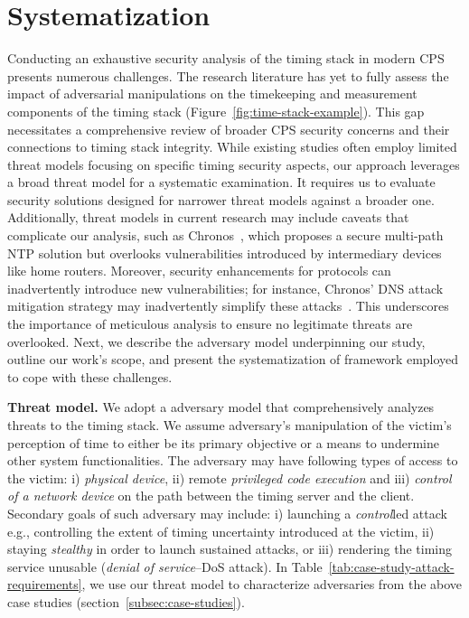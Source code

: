 \section{Systematization}\label{overview}

Conducting an exhaustive security analysis of the timing stack in modern CPS presents numerous challenges. The research literature has yet to fully assess the impact of adversarial manipulations on the timekeeping and measurement components of the timing stack (Figure~\ref{fig:time-stack-example}). This gap necessitates a comprehensive review of broader CPS security concerns and their connections to timing stack integrity. While existing studies often employ limited threat models focusing on specific timing security aspects, our approach leverages a broad threat model for a systematic examination. It requires us to evaluate security solutions designed for narrower threat models against a broader one. Additionally, threat models in current research may include caveats that complicate our analysis, such as Chronos~\cite{net-sync-chronos}, which proposes a secure multi-path NTP solution but overlooks vulnerabilities introduced by intermediary devices like home routers. Moreover, security enhancements for protocols can inadvertently introduce new vulnerabilities; for instance, Chronos' DNS attack mitigation strategy may inadvertently simplify these attacks~\cite{pitfalls-chronos}. This underscores the importance of meticulous analysis to ensure no legitimate threats are overlooked. Next, we describe the adversary model underpinning our study, outline our work's scope, and present the systematization of framework employed to cope with these challenges.

\noindent\textbf{Threat model.} We adopt a adversary model that comprehensively analyzes threats to the timing stack. We assume adversary's manipulation of the victim's perception of time to either be its primary objective or a means to undermine other system functionalities. The adversary may have following types of access to the victim: i) \textit{physical device}, ii) remote \textit{privileged code execution} and iii) \textit{control of a network device} on the path between the timing server and the client. Secondary goals of such adversary may include: i) launching a \textit{control}led attack e.g., controlling the extent of timing uncertainty introduced at the victim, ii) staying \textit{stealthy} in order to launch sustained attacks, or iii) rendering the timing service unusable (\textit{denial of service}--DoS attack). In Table~\ref{tab:case-study-attack-requirements}, we use our threat model to characterize adversaries from the above case studies (section~\ref{subsec:case-studies}).

